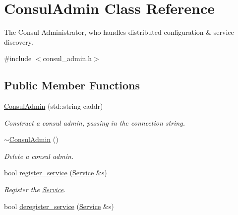\hypertarget{classConsulAdmin}{\section{Consul\-Admin Class Reference}
\label{classConsulAdmin}
}


The Consul Administrator, who handles distributed configuration \& service discovery.  




{\ttfamily \#include $<$consul\-\_\-admin.\-h$>$}

\subsection*{Public Member Functions}
\begin{DoxyCompactItemize}
\item 
\hypertarget{classConsulAdmin_aafb2c493da3672acc348fd865036a883}{\hyperlink{classConsulAdmin_aafb2c493da3672acc348fd865036a883}{Consul\-Admin} (std\-::string caddr)}\label{classConsulAdmin_aafb2c493da3672acc348fd865036a883}

\begin{DoxyCompactList}\small\item\em Construct a consul admin, passing in the connection string. \end{DoxyCompactList}\item 
\hypertarget{classConsulAdmin_ac84ff8c80f6bd731329c8acb6d236759}{\hyperlink{classConsulAdmin_ac84ff8c80f6bd731329c8acb6d236759}{$\sim$\-Consul\-Admin} ()}\label{classConsulAdmin_ac84ff8c80f6bd731329c8acb6d236759}

\begin{DoxyCompactList}\small\item\em Delete a consul admin. \end{DoxyCompactList}\item 
\hypertarget{classConsulAdmin_aa83d0567051f66cf014f235586b2780f}{bool \hyperlink{classConsulAdmin_aa83d0567051f66cf014f235586b2780f}{register\-\_\-service} (\hyperlink{classService}{Service} \&s)}\label{classConsulAdmin_aa83d0567051f66cf014f235586b2780f}

\begin{DoxyCompactList}\small\item\em Register the \hyperlink{classService}{Service}. \end{DoxyCompactList}\item 
\hypertarget{classConsulAdmin_ab3772ffad9c8751fd3ba909b67c9af5b}{bool \hyperlink{classConsulAdmin_ab3772ffad9c8751fd3ba909b67c9af5b}{deregister\-\_\-service} (\hyperlink{classService}{Service} \&s)}\label{classConsulAdmin_ab3772ffad9c8751fd3ba909b67c9af5b}


\end{DoxyCompactItemize}
